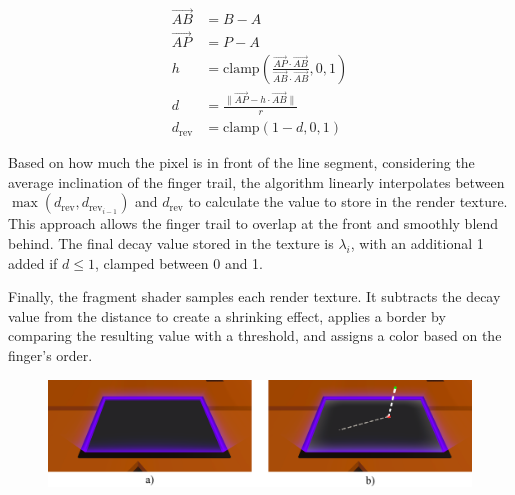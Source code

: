         \begin{figure}[h]
        \begin{equation}
        \begin{split} \label{eq:distance_line}
            \vec{AB} &= B - A \\
            \vec{AP} &= P - A \\
            h &= \mathrm{clamp} \left( \frac{\vec{AP} \cdot \vec{AB}}{\vec{AB} \cdot \vec{AB}} , 0, 1\right)  \\
            d &= \frac{\| \vec{AP} - h \cdot \vec{AB} \|}{r} \\
            d_{\mathrm{rev}} &= \mathrm{clamp} \left( 1 - d , 0 , 1\right)
        \end{split}
        \end{equation}
        \end{figure}




        Based on how much the pixel is in front of the line segment, considering the average inclination of the finger trail, the algorithm linearly interpolates between \(\max\left(d_{\text{rev}}, d_{\text{rev}_{i-1}}\right)\) and \(d_{\text{rev}}\) to calculate the value to store in the render texture. This approach allows the finger trail to overlap at the front and smoothly blend behind. The final decay value stored in the texture is \(\lambda_i\), with an additional 1 added if \(d \leq 1\), clamped between 0 and 1.

        Finally, the fragment shader samples each render texture. It subtracts the decay value from the distance to create a shrinking effect, applies a border by comparing the resulting value with a threshold, and assigns a color based on the finger's order.

        \begin{figure}[h!]
            \centering
            \includegraphics[width=1\textwidth]{figures/frame_glow.png}
            \label{fig:frame_glow}
        \end{figure}

